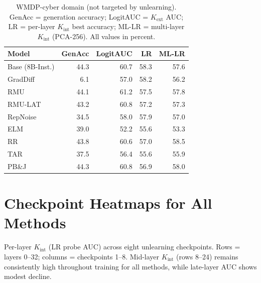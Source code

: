 \documentclass[11pt]{article}
\begin{document}
\begin{table}[h]
\centering
\caption{WMDP-cyber domain (not targeted by unlearning).
GenAcc = generation accuracy; LogitAUC = $K_\text{ext}$ AUC;
LR = per-layer $K_\text{int}$ best accuracy; ML-LR = multi-layer $K_\text{int}$
(PCA-256). All values in percent.}
\label{tab:cyber}
\small
\setlength{\tabcolsep}{4pt}
\begin{tabular}{lrrrr}
\toprule
\textbf{Model} & \textbf{GenAcc} & \textbf{LogitAUC}
               & \textbf{LR} & \textbf{ML-LR} \\
\midrule
Base (8B-Inst.)  & 44.3 & 60.7 & 58.3 & 57.6 \\
\midrule
GradDiff  &  6.1 & 57.0 & 58.2 & 56.2 \\
RMU       & 44.1 & 61.2 & 57.5 & 57.8 \\
RMU-LAT   & 43.2 & 60.8 & 57.2 & 57.3 \\
RepNoise  & 34.5 & 58.0 & 57.9 & 57.0 \\
ELM       & 39.0 & 52.2 & 55.6 & 53.3 \\
RR        & 43.8 & 60.6 & 57.0 & 58.5 \\
TAR       & 37.5 & 56.4 & 55.6 & 55.9 \\
PB\&J     & 44.3 & 60.8 & 56.9 & 58.0 \\
\bottomrule
\end{tabular}
\end{table}

\section{Checkpoint Heatmaps for All Methods}
\label{app:checkpoint-heatmaps}

Per-layer $K_\text{int}$ (LR probe AUC) across eight unlearning checkpoints.
Rows = layers 0--32; columns = checkpoints 1--8. Mid-layer $K_\text{int}$
(rows 8--24) remains consistently high throughout training for all methods,
while late-layer AUC shows modest decline.
\end{document}
